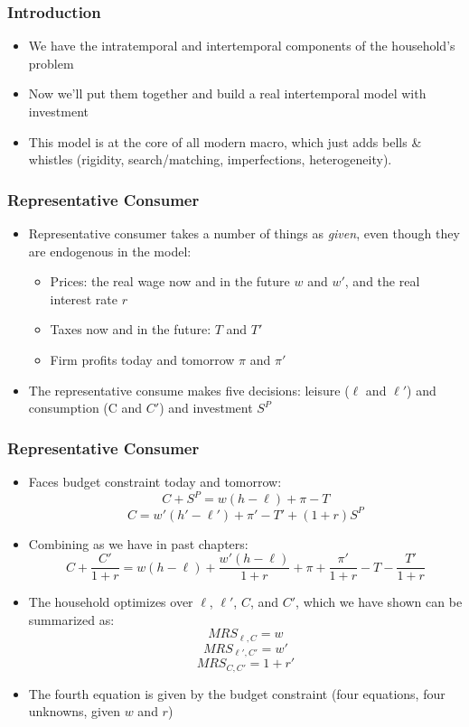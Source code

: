 \documentclass{beamer}
\author{Trevor S. Gallen}
\date{}
\begin{document}
\renewcommand*{\inserttotalframenumber}{\pageref{lastframe}}



\begin{frame}
\titlepage
\end{frame}

\begin{frame}
\frametitle[alignment=center]{Introduction}
\begin{itemize}
\item We have the intratemporal and intertemporal components of the household's problem
\bigskip
\item Now we'll put them together and build a real intertemporal model with investment
\bigskip
\item This model is at the core of all modern macro, which just adds bells \& whistles (rigidity, search/matching, imperfections, heterogeneity).
\end{itemize}
\end{frame}

\begin{frame}
\frametitle[alignment=center]{Representative Consumer}
\begin{itemize}
\item Representative consumer takes a number of things as \emph{given}, even though they are endogenous in the model:
\smallskip
\begin{itemize}
\item Prices: the real wage now and in the future $w$ and $w'$, and the real interest rate $r$
\smallskip
\item Taxes now and in the future: $T$ and $T'$
\smallskip
\item Firm profits today and tomorrow $\pi$ and $\pi'$
\end{itemize}
\smallskip
\item The representative consume makes five decisions: leisure ($\ell$ and $\ell'$) and consumption (C and $C'$) and investment $S^P$
\end{itemize}
\end{frame}


\begin{frame}
\frametitle[alignment=center]{Representative Consumer}
\begin{itemize}
\item Faces budget constraint today and tomorrow:
$$C+S^P=w(h-\ell)+\pi-T$$
$$C= w'(h'-\ell')+\pi'-T'+(1+r)S^P$$
\item Combining as we have in past chapters:
$$C+\frac{C'}{1+r}=w(h-\ell)+\frac{w'(h-\ell)}{1+r}+\pi+\frac{\pi'}{1+r}-T-\frac{T'}{1+r}$$
\item The household optimizes over $\ell$, $\ell'$, $C$, and $C'$, which we have shown can be summarized as:
$$MRS_{\ell,C}=w$$
$$MRS_{\ell',C'}=w'$$
$$MRS_{C,C'}=1+r'$$
\item The fourth equation is given by the budget constraint (four equations, four unknowns, given $w$ and $r$)
\end{itemize}
\end{frame}
\end{document}
